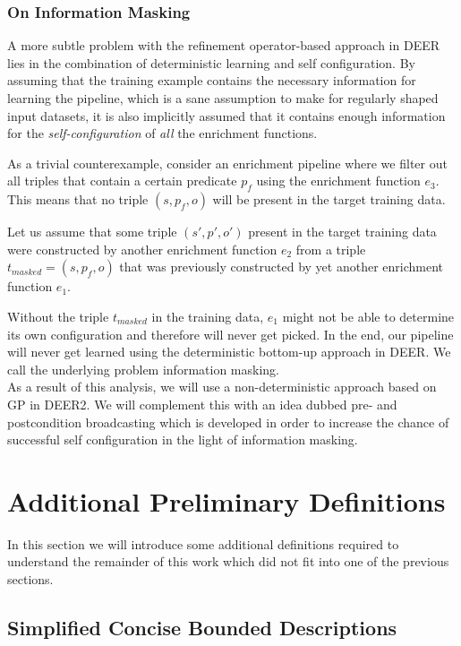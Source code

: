 \subsubsection*{On Information Masking}

A more subtle problem with the refinement operator-based approach in \ac{DEER} lies in the combination of deterministic learning and self configuration.
By assuming that the training example contains the necessary information for learning the pipeline, which is a sane assumption to make for regularly shaped input datasets, it is also implicitly assumed that it contains enough information for the \emph{self-configuration} of \emph{all} the enrichment functions.

As a trivial counterexample, consider an enrichment pipeline where we filter out all triples that contain a certain predicate $p_f$ using the enrichment function $e_3$.
This means that no triple $(s, p_f, o)$ will be present in the target training data.

Let us assume that some triple $(s', p', o')$ present in the target training data were constructed by another enrichment function $e_2$ from a triple $t_{masked}=(s, p_f, o)$ that was previously constructed by yet another enrichment function $e_1$.

Without the triple $t_{masked}$ in the training data, $e_1$ might not be able to determine its own configuration and therefore will never get picked.
In the end, our pipeline will never get learned using the deterministic bottom-up approach in \ac{DEER}.
We call the underlying problem information masking.\\

As a result of this analysis, we will use a non-deterministic approach based on \ac{GP} in \ac{DEER2}. We will complement this with an idea dubbed pre- and postcondition broadcasting which is developed in order to increase the chance of successful self configuration in the light of information masking.

\section{Additional Preliminary Definitions}

In this section we will introduce some additional definitions required to understand the remainder of this work which did not fit into one of the previous sections.

\subsection{Simplified Concise Bounded Descriptions}

